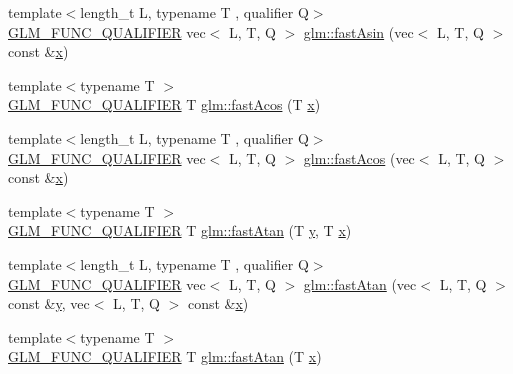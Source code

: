 \begin{DoxyCompactItemize}
\item 
{\footnotesize template$<$length\+\_\+t L, typename T , qualifier Q$>$ }\\\hyperlink{setup_8hpp_a33fdea6f91c5f834105f7415e2a64407}{G\+L\+M\+\_\+\+F\+U\+N\+C\+\_\+\+Q\+U\+A\+L\+I\+F\+I\+ER} vec$<$ L, T, Q $>$ \hyperlink{namespaceglm_ab68197620bdf27dda884e87d5bc588f0}{glm\+::fast\+Asin} (vec$<$ L, T, Q $>$ const \&\hyperlink{_s_d_l__opengl_8h_ad0e63d0edcdbd3d79554076bf309fd47}{x})
\item 
{\footnotesize template$<$typename T $>$ }\\\hyperlink{setup_8hpp_a33fdea6f91c5f834105f7415e2a64407}{G\+L\+M\+\_\+\+F\+U\+N\+C\+\_\+\+Q\+U\+A\+L\+I\+F\+I\+ER} T \hyperlink{group__gtx__fast__trigonometry_ga9721d63356e5d94fdc4b393a426ab26b}{glm\+::fast\+Acos} (T \hyperlink{_s_d_l__opengl_8h_ad0e63d0edcdbd3d79554076bf309fd47}{x})
\item 
{\footnotesize template$<$length\+\_\+t L, typename T , qualifier Q$>$ }\\\hyperlink{setup_8hpp_a33fdea6f91c5f834105f7415e2a64407}{G\+L\+M\+\_\+\+F\+U\+N\+C\+\_\+\+Q\+U\+A\+L\+I\+F\+I\+ER} vec$<$ L, T, Q $>$ \hyperlink{namespaceglm_ae3688eb19af1c7efa981e983fee56340}{glm\+::fast\+Acos} (vec$<$ L, T, Q $>$ const \&\hyperlink{_s_d_l__opengl_8h_ad0e63d0edcdbd3d79554076bf309fd47}{x})
\item 
{\footnotesize template$<$typename T $>$ }\\\hyperlink{setup_8hpp_a33fdea6f91c5f834105f7415e2a64407}{G\+L\+M\+\_\+\+F\+U\+N\+C\+\_\+\+Q\+U\+A\+L\+I\+F\+I\+ER} T \hyperlink{group__gtx__fast__trigonometry_ga8d197c6ef564f5e5d59af3b3f8adcc2c}{glm\+::fast\+Atan} (T \hyperlink{_s_d_l__opengl_8h_a1675d9d7bb68e1657ff028643b4037e3}{y}, T \hyperlink{_s_d_l__opengl_8h_ad0e63d0edcdbd3d79554076bf309fd47}{x})
\item 
{\footnotesize template$<$length\+\_\+t L, typename T , qualifier Q$>$ }\\\hyperlink{setup_8hpp_a33fdea6f91c5f834105f7415e2a64407}{G\+L\+M\+\_\+\+F\+U\+N\+C\+\_\+\+Q\+U\+A\+L\+I\+F\+I\+ER} vec$<$ L, T, Q $>$ \hyperlink{namespaceglm_ac18dd649f172f948924f711c796a4d3d}{glm\+::fast\+Atan} (vec$<$ L, T, Q $>$ const \&\hyperlink{_s_d_l__opengl_8h_a1675d9d7bb68e1657ff028643b4037e3}{y}, vec$<$ L, T, Q $>$ const \&\hyperlink{_s_d_l__opengl_8h_ad0e63d0edcdbd3d79554076bf309fd47}{x})
\item 
{\footnotesize template$<$typename T $>$ }\\\hyperlink{setup_8hpp_a33fdea6f91c5f834105f7415e2a64407}{G\+L\+M\+\_\+\+F\+U\+N\+C\+\_\+\+Q\+U\+A\+L\+I\+F\+I\+ER} T \hyperlink{group__gtx__fast__trigonometry_gae25de86a968490ff56856fa425ec9d30}{glm\+::fast\+Atan} (T \hyperlink{_s_d_l__opengl_8h_ad0e63d0edcdbd3d79554076bf309fd47}{x})

\end{DoxyCompactItemize}
